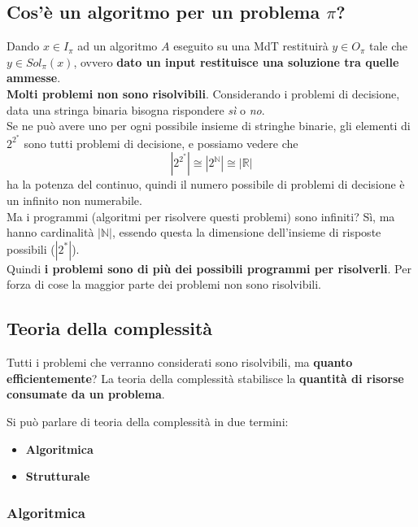 \newpage

\subsection{Cos'è un algoritmo per un problema $\pi$?}

Dando $x \in I_\pi$ ad un algoritmo $A$ eseguito su una MdT restituirà $y \in O_\pi$ tale che $y \in Sol_\pi (x)$, ovvero \textbf{dato un input restituisce una soluzione tra quelle ammesse}.\\

\textbf{Molti problemi non sono risolvibili}. Considerando i problemi di decisione, data una stringa binaria bisogna rispondere \textit{sì} o \textit{no}.\\

Se ne può avere uno per ogni possibile insieme di stringhe binarie, gli elementi di $2^{2^\ast}$ sono tutti problemi di decisione, e possiamo vedere che
$$ |2^{2^\ast}| \cong |2^{\mathbb{N}}| \cong |\mathbb{R}|$$
ha la potenza del continuo, quindi il numero possibile di problemi di decisione è un infinito non numerabile. \\

Ma i programmi (algoritmi per risolvere questi problemi) sono infiniti? Sì, ma hanno cardinalità $|\mathbb{N}|$, essendo questa la dimensione dell'insieme di risposte possibili ($|2^\ast|$).\\

Quindi \textbf{i problemi sono di più dei possibili programmi per risolverli}. Per forza di cose la maggior parte dei problemi non sono risolvibili. \\

\newpage

\subsection{Teoria della complessità}
Tutti i problemi che verranno considerati sono risolvibili, ma \textbf{quanto efficientemente}? La teoria della complessità stabilisce la \textbf{quantità di risorse consumate da un problema}.

Si può parlare di teoria della complessità in due termini:
\begin{itemize}
	\item \textbf{Algoritmica}
	\item \textbf{Strutturale}
\end{itemize}


\subsubsection{Algoritmica}

